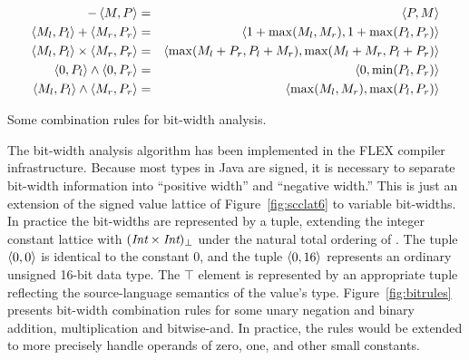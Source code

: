 \begin{myfigure}
\begin{eqnarray*}
-\left\langle M,P \right\rangle &=& \left\langle P,M \right\rangle\\
\left\langle M_l,P_l \right\rangle + \left\langle M_r,P_r \right\rangle &=& \left\langle 1+\max(M_l,M_r),1+\max(P_l,P_r) \right\rangle\\
\left\langle M_l,P_l \right\rangle \times \left\langle M_r,P_r \right\rangle &=& \left\langle \max(M_l+P_r,P_l+M_r),
                                             \max(M_l+M_r,P_l+P_r) \right\rangle\\
\left\langle 0,P_l \right\rangle \wedge \left\langle 0,P_r \right\rangle &=& \left\langle 0,\min(P_l,P_r) \right\rangle\\
\left\langle M_l,P_l \right\rangle\wedge \left\langle M_r,P_r \right\rangle &=& \left\langle \max(M_l,M_r),\max(P_l,P_r) \right\rangle
\end{eqnarray*}%
\caption{Some combination rules for bit-width analysis.}\label{fig:bitrules}
\end{myfigure}
The bit-width analysis algorithm has been implemented in the FLEX
compiler infrastructure.  Because most types in Java are signed, it is
necessary to separate bit-width information into ``positive width''
and ``negative width.''  This is just an extension of the
signed value lattice of Figure~\ref{fig:scclat6} to variable
bit-widths.  In practice the bit-widths are represented by a tuple,
extending the integer constant lattice with
$({\mbox{\em Int}}\times{\mbox{\em Int}})_{\bot}$ under the natural total
ordering of .  The tuple $\left\langle 0,0 \right\rangle$ is identical to the
constant 0, and the tuple $\left\langle 0,16 \right\rangle$ represents an ordinary
unsigned 16-bit data type.  The $\top$ element is represented by an
appropriate tuple reflecting the source-language semantics of the
value's type.  Figure~\ref{fig:bitrules} presents bit-width
combination rules for some unary negation and binary addition,
multiplication and bitwise-and.  In practice, the rules would be
extended to more precisely handle operands of zero, one, and other
small constants.
